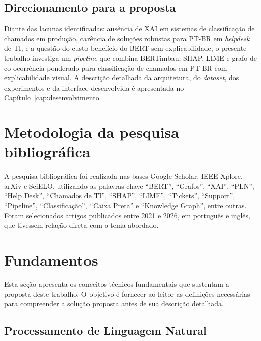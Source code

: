 \documentclass[
    12pt,                %
    openright,           %
    oneside,             %
    a4paper,             %
    english,             %
    brazil               %
]{abntex2}
\begin{document}
\subsection{Direcionamento para a proposta}
\label{subsec:sintese_direcao}

Diante das lacunas identificadas: ausência de XAI em sistemas de classificação de chamados em produção, carência de soluções robustas para PT-BR em \textit{helpdesk} de TI, e a questão do custo-benefício do BERT sem explicabilidade, o presente trabalho investiga um \textit{pipeline} que combina BERTimbau, SHAP, LIME e grafo de co-ocorrência ponderado para classificação de chamados em PT-BR com explicabilidade visual. A descrição detalhada da arquitetura, do \textit{dataset}, dos experimentos e da interface desenvolvida é apresentada no Capítulo~\ref{cap:desenvolvimento}.

\section{Metodologia da pesquisa bibliográfica}
\label{sec:metodologia_pesquisa}

A pesquisa bibliográfica foi realizada nas bases Google Scholar, IEEE Xplore, arXiv e SciELO, utilizando as palavras-chave ``BERT'', ``Grafos'', ``XAI'', ``PLN'', ``Help Desk'', ``Chamados de TI'', ``SHAP'', ``LIME'', ``Tickets'', ``Support'', ``Pipeline'', ``Classificação'', ``Caixa Preta'' e ``Knowledge Graph'', entre outras. Foram selecionados artigos publicados entre 2021 e 2026, em português e inglês, que tivessem relação direta com o tema abordado.

\section{Fundamentos}
\label{sec:fundamentos}
 
Esta seção apresenta os conceitos técnicos fundamentais que sustentam a proposta deste trabalho. O objetivo é fornecer ao leitor as definições necessárias para compreender a solução proposta antes de sua descrição detalhada.
 
\subsection{Processamento de Linguagem Natural}
 
\end{document}

